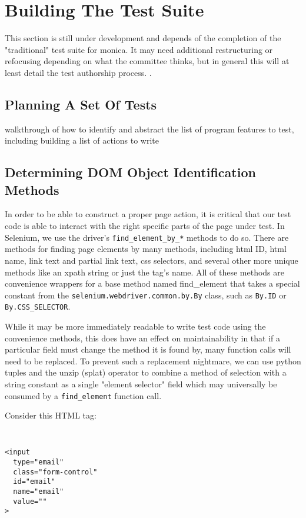 \section{Building The Test Suite}
This section is still under development and depends of the completion of the "traditional" test suite for monica. It may need additional restructuring or refocusing depending on what the committee thinks, but in general this will at least detail the test authorship process. \citep{GitHubma29}. %

\subsection{Planning A Set Of Tests}
walkthrough of how to identify and abstract the list of program features to test, including building a list of actions to write \citep{nguyen2001testing} %

\subsection{Determining DOM Object Identification Methods}
In order to be able to construct a proper page action, it is critical that our test code is able to interact with the right specific parts of the page under test. In Selenium, we use the driver's \texttt{find\_element\_by\_*} methods to do so. There are methods for finding page elements by many methods, including html ID, html name, link text and partial link text, css selectors, and several other more unique methods like an xpath string or just the tag's name. All of these methods are convenience wrappers for a base method named find\_element that takes a special constant from the \texttt{selenium.webdriver.common.by.By} class, such as \texttt{By.ID} or \texttt{By.CSS\_SELECTOR}.

While it may be more immediately readable to write test code using the convenience methods, this does have an effect on maintainability in that if a particular field must change the method it is found by, many function calls will need to be replaced. To prevent such a replacement nightmare, we can use python tuples and the unzip (splat) operator to combine a method of selection with a string constant as a single "element selector" field which may universally be consumed by a \texttt{find\_element} function call.

Consider this HTML tag:

{\tt
\begin{verbatim}
<input
  type="email"
  class="form-control"
  id="email"
  name="email"
  value=""
>
\end{verbatim}
}

